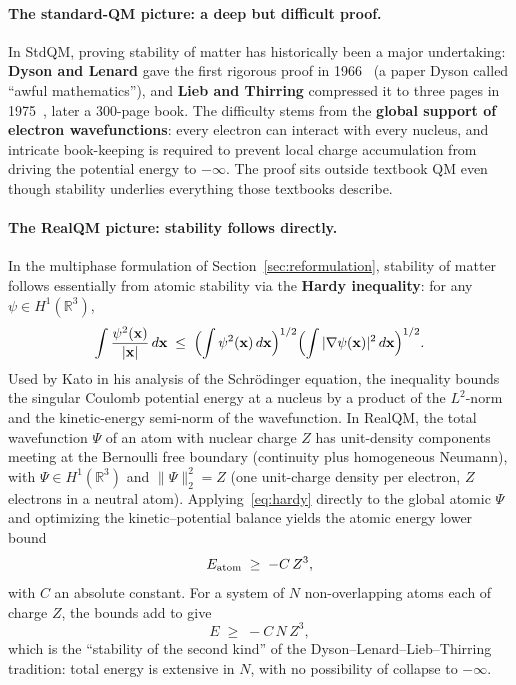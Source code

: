 \documentclass[11pt]{article}
\begin{document}
\paragraph{The standard-QM picture: a deep but difficult proof.}
In StdQM, proving stability of matter has historically been a major undertaking: \textbf{Dyson and Lenard} gave the first rigorous proof in 1966~\cite{DysonLenard67} (a paper Dyson called ``awful mathematics''), and \textbf{Lieb and Thirring} compressed it to three pages in 1975~\cite{LiebThirring75}, later a 300-page book. The difficulty stems from the \textbf{global support of electron wavefunctions}: every electron can interact with every nucleus, and intricate book-keeping is required to prevent local charge accumulation from driving the potential energy to $-\infty$. The proof sits outside textbook QM even though stability underlies everything those textbooks describe.

\paragraph{The RealQM picture: stability follows directly.}
In the multiphase formulation of Section~\ref{sec:reformulation}, stability of matter follows essentially from atomic stability via the \textbf{Hardy inequality}: for any $\psi \in H^1(\mathbb{R}^3)$,
\begin{equation}\label{eq:hardy}
\int \frac{\psi^2(\mathbf{x})}{|\mathbf{x}|} \, d\mathbf{x}
\;\le\;
\Bigl(\int \psi^2(\mathbf{x}) \, d\mathbf{x}\Bigr)^{1/2}
\Bigl(\int |\nabla \psi(\mathbf{x})|^2 \, d\mathbf{x}\Bigr)^{1/2}.
\end{equation}
Used by Kato in his analysis of the Schr\"odinger equation, the inequality bounds the singular Coulomb potential energy at a nucleus by a product of the $L^2$-norm and the kinetic-energy semi-norm of the wavefunction. In RealQM, the total wavefunction $\Psi$ of an atom with nuclear charge $Z$ has unit-density components meeting at the Bernoulli free boundary (continuity plus homogeneous Neumann), with $\Psi \in H^1(\mathbb{R}^3)$ and $\|\Psi\|_2^2 = Z$ (one unit-charge density per electron, $Z$ electrons in a neutral atom). Applying~\eqref{eq:hardy} directly to the global atomic $\Psi$ and optimizing the kinetic--potential balance yields the atomic energy lower bound
\begin{equation}\label{eq:atom-bound}
E_{\rm atom} \;\ge\; -C\, Z^3,
\end{equation}
with $C$ an absolute constant. For a system of $N$ non-overlapping atoms each of charge $Z$, the bounds add to give
\begin{equation}\label{eq:bulk-bound}
E \;\ge\; -C\, N\, Z^3,
\end{equation}
which is the ``stability of the second kind'' of the Dyson--Lenard--Lieb--Thirring tradition: total energy is extensive in $N$, with no possibility of collapse to $-\infty$.
\end{document}
